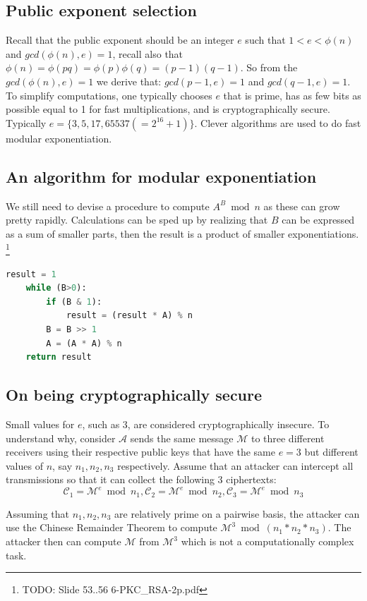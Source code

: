 \subsection{Public exponent selection}

Recall that the public exponent should be an integer $e$ such that $1 < e < \phi(n)$ and $gcd(\phi(n), e) = 1$, recall also that $\phi(n) = \phi(p q) = \phi(p) \phi(q) = (p - 1) (q - 1)$. So from the $gcd(\phi(n),e) = 1$ we derive that: $gcd(p - 1, e) = 1$ and $gcd(q - 1, e) = 1$. To simplify computations, one typically chooses $e$ that is prime, has as few bits as possible equal to 1 for fast multiplications, and is cryptographically secure. Typically $e=\{3,5,17,65537 (=2^{16} + 1)\}$. 
Clever algorithms are used to do fast modular exponentiation.

\subsection{An algorithm for modular exponentiation}

We still need to devise a procedure to compute $A^B \bmod n$ as these can grow pretty rapidly. Calculations can be sped up by realizing that $B$  can be expressed as a sum of smaller parts, then the result is a product of smaller exponentiations. \footnote{TODO: Slide 53..56 6-PKC\_RSA-2p.pdf}

\begin{lstlisting}[language=python]
	result = 1
	while (B>0):
		if (B & 1):
			result = (result * A) % n
		B = B >> 1
		A = (A * A) % n
	return result
\end{lstlisting}


\subsection{On being cryptographically secure}
Small values for $e$, such as 3, are considered cryptographically insecure. To understand why, consider $\mathcal{A}$ sends the same message $\mathcal{M}$ to three different receivers using their respective public keys that have the same $e = 3$ but different values of $n$, say $n_1, n_2, n_3$ respectively. Assume that an attacker can intercept all transmissions so that it can collect the following 3 ciphertexts: 
\[\mathcal{C}_1 = \mathcal{M}^e \bmod n_1, \mathcal{C}_2 = \mathcal{M}^e \bmod n_2, \mathcal{C}_3 = \mathcal{M}^e \bmod n_3\]

Assuming that $n_1, n_2, n_3$ are relatively prime on a pairwise basis, the attacker can
use the Chinese Remainder Theorem to compute $\mathcal{M}^3 \bmod (n_1 * n_2 * n_3)$. The attacker then can compute $\mathcal{M}$ from $\mathcal{M}^3$ which is not a computationally complex task.

